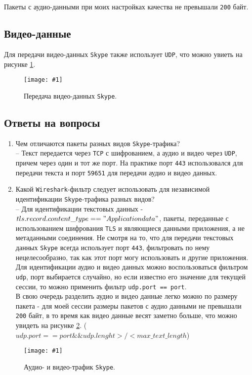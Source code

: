 \documentclass[12pt, a4paper]{article}
\newcommand{\figc}[4]{
  \begin{figure}[H]
  \begin{center}
    \texttt{[image: \#1]}
    \caption{#2}
    \label{fig:#3}
  \end{center}
  \end{figure}
}
\begin{document}
Пакеты с аудио-данными при моих настройках качества не превышали \texttt{200} байт.

\subsection{Видео-данные}

Для передачи видео-данных \texttt{Skype} также использует \texttt{UDP}, что
можно увиеть на рисунке \ref{fig:sk_vd}.

\figc{skype_video}{Передача видео-данных \texttt{Skype}.}{sk_vd}{2.5}

\subsection{Ответы на вопросы}

\begin{enumerate}
  \item Чем отличаются пакеты разных видов \texttt{Skype}-трафика?\\
    -- Текст передается через \texttt{TCP} с шифрованием, а аудио и видео
    через \texttt{UDP}, причем через один и тот же порт. На практике порт
    \texttt{443} использовался для передачи текста и порт \texttt{59651} для
    передачи аудио и видео данных.
  \item Какой \texttt{Wireshark}-фильтр следует использовать для независимой
    идентификации \texttt{Skype}-трафика разных видов?\\
    -- Для идентификации текстовых данных - \texttt{$tls.record.content\_type == "Application data"$},
    пакеты, переданные с использованием шифрования \texttt{TLS} и являющиеся
    данными приложения, а не метаданными соединения. Не смотря на то, что
    для передачи текстовых данных \texttt{Skype} всегда использует порт \texttt{443},
    фильтровать по нему нецелесообразно, так как этот порт могу использовать
    и другие приложения.\\
    Для идентификации аудио и видео данных можно воспользоваться фильтром
    \texttt{udp}, порт выбирается случайно, но если известно его значение для
    текущей сессии, то можно применить фильтр \texttt{udp.port == port}.\\
    В свою очередь разделить аудио и видео данные легко можно по размеру пакета
    - для моей сессии размеры пакетов с аудио данными не превышали \texttt{200} байт,
    в то время как видео данные весят заметно больше, что можно увидеть на рисунке
    \ref{fig:sk_au_vd}.
    (\texttt{$udp.port == port \&\& udp.lenght >/< max\_text\_length$})
\end{enumerate}

\figc{skype_audio_video}{Аудио- и видео-трафик \texttt{Skype}.}{sk_au_vd}{2.5}
\end{document}
